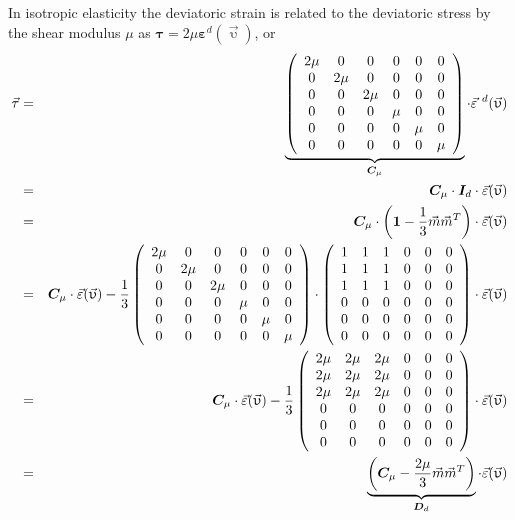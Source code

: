 In isotropic elasticity the deviatoric strain is related to the deviatoric stress by the shear modulus $\mu$ as ${\bm \tau}=2\mu {\bm \varepsilon}^d(\vec\upupsilon)$, or
\begin{eqnarray}
\vec{\tau} %
&=& 
\underbrace{
\left(
\begin{array}{cccccc}
2\mu & 0 & 0 & 0 & 0 & 0 \\ 
0 & 2\mu & 0 & 0 & 0 & 0 \\ 
0 & 0 & 2\mu & 0 & 0 & 0 \\
0 & 0 & 0 & \mu & 0 & 0 \\ 
0 & 0 & 0 & 0 & \mu & 0 \\ 
0 & 0 & 0 & 0 & 0 & \mu  
\end{array}
\right)}_{{\bm C}_\mu}
\cdot 
\vec{\varepsilon}^{~d}(\vec\upupsilon) \nn\\
&=&
{\bm C}_\mu\cdot
{\bm I}_d \cdot \vec{\varepsilon}(\vec\upupsilon) \nn\\
&=&
{\bm C}_\mu\cdot
\left( {\bm 1} -\frac13 \vec{m} \vec{m}^T \right) \cdot\vec{\varepsilon}(\vec\upupsilon) \nn\\
&=&
{\bm C}_\mu
\cdot  \vec{\varepsilon}(\vec\upupsilon)
- \frac13
\left(
\begin{array}{cccccc}
2\mu & 0 & 0 & 0 & 0 & 0 \\ 
0 & 2\mu & 0 & 0 & 0 & 0 \\ 
0 & 0 & 2\mu & 0 & 0 & 0 \\
0 & 0 & 0 & \mu & 0 & 0 \\ 
0 & 0 & 0 & 0 & \mu & 0 \\ 
0 & 0 & 0 & 0 & 0 & \mu  
\end{array}
\right)
\cdot\left(
\begin{array}{cccccc}
1 & 1 & 1 & 0 & 0 & 0 \\ 
1 & 1 & 1 & 0 & 0 & 0 \\ 
1 & 1 & 1 & 0 & 0 & 0 \\ 
0 & 0 & 0 & 0 & 0 & 0 \\ 
0 & 0 & 0 & 0 & 0 & 0 \\ 
0 & 0 & 0 & 0 & 0 & 0  
\end{array}
\right) 
\cdot  \vec{\varepsilon}(\vec\upupsilon) \nn\\
&=&
{\bm C}_\mu
\cdot  \vec{\varepsilon}(\vec\upupsilon)
- \frac13
\left(
\begin{array}{cccccc}
2\mu & 2\mu & 2\mu & 0 & 0 & 0 \\ 
2\mu & 2\mu & 2\mu & 0 & 0 & 0 \\ 
2\mu & 2\mu & 2\mu & 0 & 0 & 0 \\ 
0 & 0 & 0 & 0 & 0 & 0 \\ 
0 & 0 & 0 & 0 & 0 & 0 \\ 
0 & 0 & 0 & 0 & 0 & 0  
\end{array}
\right) 
\cdot  \vec{\varepsilon}(\vec\upupsilon) \nn\\
&=& \underbrace{
\left( {\bm C}_\mu - \frac{2\mu}{3} \vec{m} \vec{m}^T \right)
}_{{\bm D}_d }\cdot\vec{\varepsilon}(\vec\upupsilon) 
\end{eqnarray}
